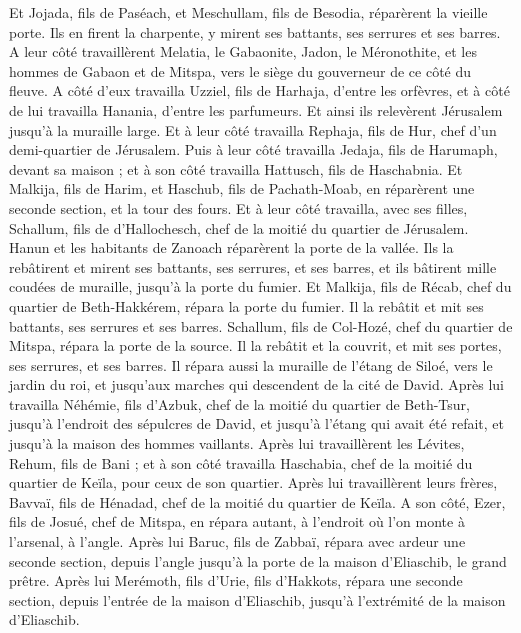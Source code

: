 \begin{multicols}{2}
Et Jojada, fils de Paséach, et Meschullam, fils de Besodia, réparèrent la vieille porte. Ils en firent la charpente, y mirent ses battants, ses serrures et ses barres.
A leur côté travaillèrent Melatia, le Gabaonite, Jadon, le Méronothite, et les hommes de Gabaon et de Mitspa, vers le siège du gouverneur de ce côté du fleuve.
A côté d'eux travailla Uzziel, fils de Harhaja, d'entre les orfèvres, et à côté de lui travailla Hanania, d'entre les parfumeurs. Et ainsi ils relevèrent Jérusalem jusqu'à la muraille large.
Et à leur côté travailla Rephaja, fils de Hur, chef d'un demi-quartier de Jérusalem.
Puis à leur côté travailla Jedaja, fils de Harumaph, devant sa maison ; et à son côté travailla Hattusch, fils de Haschabnia.
Et Malkija, fils de Harim, et Haschub, fils de Pachath-Moab, en réparèrent une seconde section, et la tour des fours.
Et à leur côté travailla, avec ses filles, Schallum, fils de d'Hallochesch, chef de la moitié du quartier de Jérusalem.
Hanun et les habitants de Zanoach réparèrent la porte de la vallée. Ils la rebâtirent et mirent ses battants, ses serrures, et ses barres, et ils bâtirent mille coudées de muraille, jusqu'à la porte du fumier.
Et Malkija, fils de Récab, chef du quartier de Beth-Hakkérem, répara la porte du fumier. Il la rebâtit et mit ses battants, ses serrures et ses barres.
Schallum, fils de Col-Hozé, chef du quartier de Mitspa, répara la porte de la source. Il la rebâtit et la couvrit, et mit ses portes, ses serrures, et ses barres. Il répara aussi la muraille de l'étang de Siloé, vers le jardin du roi, et jusqu'aux marches qui descendent de la cité de David.
Après lui travailla Néhémie, fils d'Azbuk, chef de la moitié du quartier de Beth-Tsur, jusqu'à l'endroit des sépulcres de David, et jusqu'à l'étang qui avait été refait, et jusqu'à la maison des hommes vaillants.
Après lui travaillèrent les Lévites, Rehum, fils de Bani ; et à son côté travailla Haschabia, chef de la moitié du quartier de Keïla, pour ceux de son quartier.
Après lui travaillèrent leurs frères, Bavvaï, fils de Hénadad, chef de la moitié du quartier de Keïla.
A son côté, Ezer, fils de Josué, chef de Mitspa, en répara autant, à l'endroit où l'on monte à l'arsenal, à l'angle.
Après lui Baruc, fils de Zabbaï, répara avec ardeur une seconde section, depuis l'angle jusqu'à la porte de la maison d'Eliaschib, le grand prêtre.
Après lui Merémoth, fils d'Urie, fils d'Hakkots, répara une seconde section, depuis l'entrée de la maison d'Eliaschib, jusqu'à l'extrémité de la maison d'Eliaschib.

\end{multicols}
